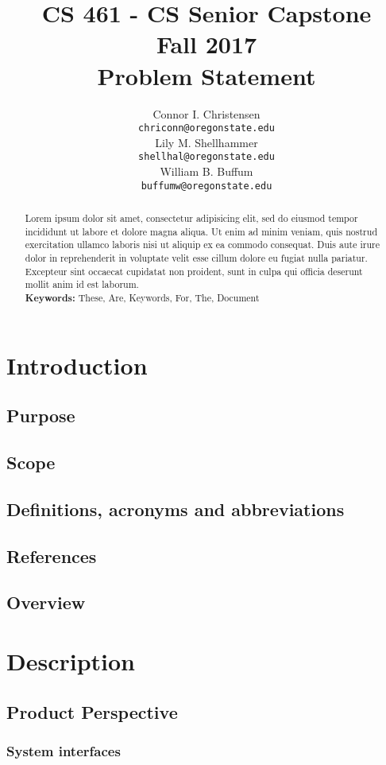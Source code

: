 \documentclass[draftclsnofoot,onecolumn,letterpaper,10pt,compsoc]{IEEEtran}
\title{CS 461 - CS Senior Capstone
	\\Fall 2017
	\\Problem Statement
}
\author{
	Connor I. Christensen \\
	\texttt{chriconn@oregonstate.edu}
	\\
	Lily M. Shellhammer \\
	\texttt{shellhal@oregonstate.edu}
	\\
	William B. Buffum \\
	\texttt{buffumw@oregonstate.edu}
}
\begin{document}
\begin{titlingpage}
    \maketitle
    \begin{abstract}
			Lorem ipsum dolor sit amet, consectetur adipisicing elit, sed do eiusmod tempor incididunt ut labore et dolore magna aliqua. Ut enim ad minim veniam, quis nostrud exercitation ullamco laboris nisi ut aliquip ex ea commodo consequat. Duis aute irure dolor in reprehenderit in voluptate velit esse cillum dolore eu fugiat nulla pariatur. Excepteur sint occaecat cupidatat non proident, sunt in culpa qui officia deserunt mollit anim id est laborum.
			\\
			\textbf{Keywords:} These, Are, Keywords, For, The, Document
    \end{abstract}
\end{titlingpage}

\section{Introduction}
	\subsection{Purpose}
	\subsection{Scope}
	\subsection{Definitions, acronyms and abbreviations}
	\subsection{References}
	\subsection{Overview}

\section{Description}
	\subsection{Product Perspective}
		\subsubsection{System interfaces}
\end{document}
